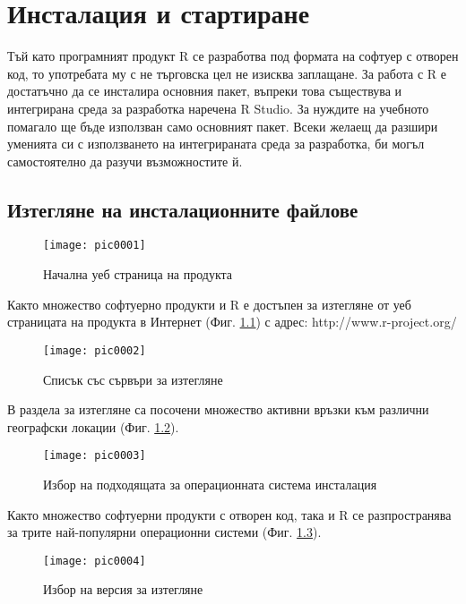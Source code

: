 \newpage
\chapter{Инсталация и стартиране}
\label{chapter01}

Тъй като програмният продукт R се разработва под формата на софтуер с отворен код, то употребата му с не търговска цел не изисква заплащане. За работа с R е достатъчно да се инсталира основния пакет, въпреки това съществува и интегрирана среда за разработка наречена R Studio. За нуждите на учебното помагало ще бъде използван само основният пакет. Всеки желаещ да разшири уменията си с използването на интегрираната среда за разработка, би могъл самостоятелно да разучи възможностите й.

\section{Изтегляне на инсталационните файлове}

\begin{figure}[h!]
  \centering
  \texttt{[image: pic0001]}
  \caption{Начална уеб страница на продукта}
\label{fig:pic0001}
\end{figure}
\FloatBarrier

Както множество софтуерно продукти и R е достъпен за изтегляне от уеб страницата на продукта в Интернет (Фиг. \ref{fig:pic0001}) с адрес: http://www.r-project.org/ 

\begin{figure}[h]
  \centering
  \texttt{[image: pic0002]}
  \caption{Списък със сървъри за изтегляне}
\label{fig:pic0002}
\end{figure}
\FloatBarrier
В раздела за изтегляне са посочени множество активни връзки към различни географски локации (Фиг. \ref{fig:pic0002}).

\begin{figure}[h]
  \centering
  \texttt{[image: pic0003]}
  \caption{Избор на подходящата за операционната система инсталация}
\label{fig:pic0003}
\end{figure}
\FloatBarrier

Както множество софтуерни продукти с отворен код, така и R се разпространява за трите най-популярни операционни системи (Фиг. \ref{fig:pic0003}).

\begin{figure}[h]
  \centering
  \texttt{[image: pic0004]}
  \caption{Избор на версия за изтегляне}
\label{fig:pic0004}
\end{figure}
\FloatBarrier

